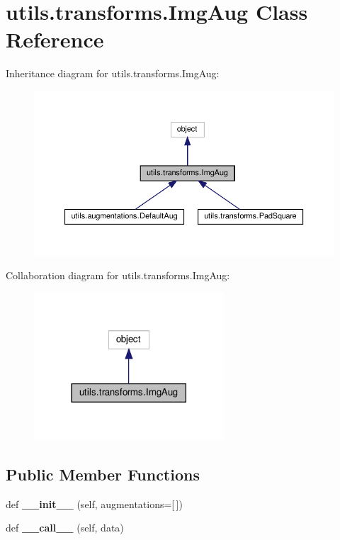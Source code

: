 \hypertarget{classutils_1_1transforms_1_1ImgAug}{}\section{utils.\+transforms.\+Img\+Aug Class Reference}
\label{classutils_1_1transforms_1_1ImgAug}


Inheritance diagram for utils.\+transforms.\+Img\+Aug\+:
\nopagebreak
\begin{figure}[H]
\begin{center}
\leavevmode
\includegraphics[width=350pt]{classutils_1_1transforms_1_1ImgAug__inherit__graph}
\end{center}
\end{figure}


Collaboration diagram for utils.\+transforms.\+Img\+Aug\+:
\nopagebreak
\begin{figure}[H]
\begin{center}
\leavevmode
\includegraphics[width=201pt]{classutils_1_1transforms_1_1ImgAug__coll__graph}
\end{center}
\end{figure}
\subsection*{Public Member Functions}
\begin{DoxyCompactItemize}
\item 
\mbox{\label{classutils_1_1transforms_1_1ImgAug_a6ad08b0c74eff6e6ec112575e04a7bd5}} 
def {\bfseries \+\_\+\+\_\+init\+\_\+\+\_\+} (self, augmentations=\mbox{[}$\,$\mbox{]})
\item 
\mbox{\label{classutils_1_1transforms_1_1ImgAug_a9787257a5c8bfeda6c87e84414ba01c3}} 
def {\bfseries \+\_\+\+\_\+call\+\_\+\+\_\+} (self, data)
\end{DoxyCompactItemize}
